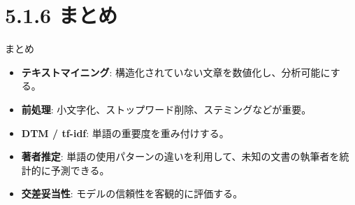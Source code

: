 \documentclass[
  ignorenonframetext,
]{beamer}
\providecommand{\tightlist}{%
  \setlength{\itemsep}{0pt}\setlength{\parskip}{0pt}}
\begin{document}
\hypertarget{ux307eux3068ux3081}{%
\section{5.1.6 まとめ}\label{ux307eux3068ux3081}}

\begin{frame}{まとめ}
\protect\hypertarget{ux307eux3068ux3081-1}{}
\begin{itemize}
\tightlist
\item
  \textbf{テキストマイニング}:
  構造化されていない文章を数値化し、分析可能にする。
\item
  \textbf{前処理}: 小文字化、ストップワード削除、ステミングなどが重要。
\item
  \textbf{DTM / tf-idf}: 単語の重要度を重み付けする。
\item
  \textbf{著者推定}:
  単語の使用パターンの違いを利用して、未知の文書の執筆者を統計的に予測できる。
\item
  \textbf{交差妥当性}: モデルの信頼性を客観的に評価する。
\end{itemize}
\end{frame}
\end{document}
